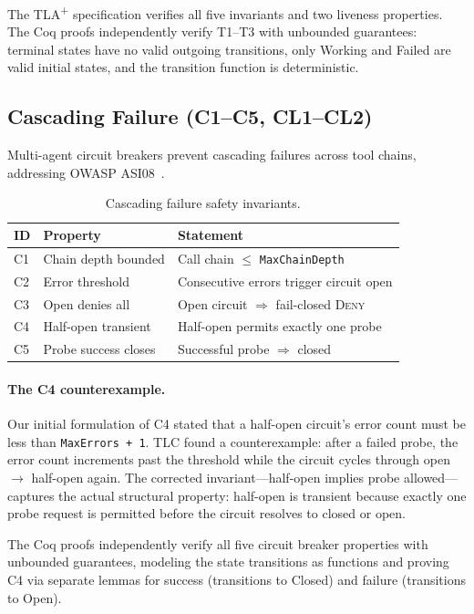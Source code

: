 \documentclass[sigplan,screen,nonacm]{acmart}
\newcommand{\tlaplus}{TLA\textsuperscript{+}\xspace}
\newcommand{\deny}{\textsc{Deny}\xspace}
\begin{document}
The \tlaplus specification verifies all five invariants and two liveness
properties. The Coq proofs independently verify T1--T3 with unbounded
guarantees: terminal states have no valid outgoing transitions, only Working
and Failed are valid initial states, and the transition function is
deterministic.


\subsection{Cascading Failure (C1--C5, CL1--CL2)}
\label{sec:cascading}

Multi-agent circuit breakers prevent cascading failures across tool chains,
addressing OWASP ASI08~\cite{owasp2026}.

\begin{table}[h]
\caption{Cascading failure safety invariants.}
\label{tab:cascade-safety}
\small
\begin{tabular}{@{}llp{5.2cm}@{}}
\toprule
ID & Property & Statement \\
\midrule
C1 & Chain depth bounded & Call chain $\leq$ \texttt{MaxChainDepth} \\
C2 & Error threshold & Consecutive errors trigger circuit open \\
C3 & Open denies all & Open circuit $\Rightarrow$ fail-closed \deny \\
C4 & Half-open transient & Half-open permits exactly one probe \\
C5 & Probe success closes & Successful probe $\Rightarrow$ closed \\
\bottomrule
\end{tabular}
\end{table}

\paragraph{The C4 counterexample.} Our initial formulation of C4 stated that
a half-open circuit's error count must be less than \texttt{MaxErrors + 1}.
TLC found a counterexample: after a failed probe, the error count increments
past the threshold while the circuit cycles through open $\rightarrow$
half-open again. The corrected invariant---half-open implies probe
allowed---captures the actual structural property: half-open is transient
because exactly one probe request is permitted before the circuit resolves
to closed or open.

The Coq proofs independently verify all five circuit breaker properties with
unbounded guarantees, modeling the state transitions as functions and proving
C4 via separate lemmas for success (transitions to Closed) and failure
(transitions to Open).
\end{document}
